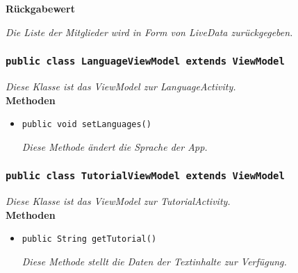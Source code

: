         	\textbf{Rückgabewert}
        	\begin{itemize}
				\textit{Die Liste der Mitglieder wird in Form von LiveData zurückgegeben.}
       		\end{itemize}
       		 
       		   \subsubsection{\texttt{public class LanguageViewModel extends ViewModel}}
        \textit{Diese Klasse ist das ViewModel zur LanguageActivity.}\\
        
		\textbf{Methoden}
 			\begin{itemize}
        		\item\texttt{{public void setLanguages()}}
        	
        		\textit{Diese Methode ändert die Sprache der App.}
        	
       		 \end{itemize}
       		 
           		\subsubsection{\texttt{public class TutorialViewModel extends ViewModel}}
        \textit{Diese Klasse ist das ViewModel zur TutorialActivity.}\\
        
		\textbf{Methoden}
 			\begin{itemize}
        		\item\texttt{{public String getTutorial()}}
        		
        		\textit{Diese Methode stellt die Daten der Textinhalte zur Verfügung.}
        	
       		 \end{itemize}